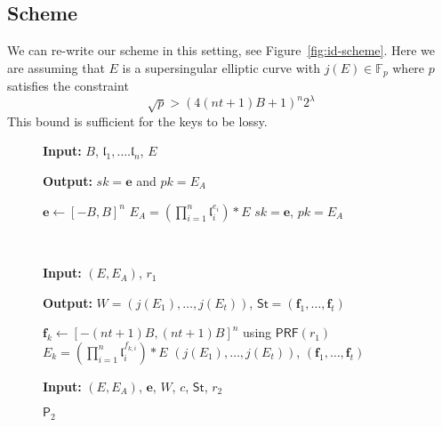 \documentclass{llncs}
\newcommand{\F}{\mathbb{F}}
\renewcommand{\l}{\mathfrak{l}}
\newcommand{\e}{\textbf{e}}
\newcommand{\f}{\textbf{f}}
\newcommand{\IGen}{\textsf{IGen}}
\newcommand{\PP}{\textsf{P}}
\newcommand{\St}{\textsf{St}}
\newcommand{\PRF}{\textsf{PRF}}
\begin{document}
\subsection{Scheme}

We can re-write our scheme in this setting, see Figure~\ref{fig:id-scheme}.
Here we are assuming that $E$ is a supersingular elliptic curve with $j(E) \in \F_p$ where $p$ satisfies the constraint
\begin{equation} \label{eq:lossy-p-bound}
  \sqrt{p} > (4(nt+1)B + 1)^{n} 2^\lambda
\end{equation}
This bound is sufficient for the keys to be lossy.


\begin{figure}
\begin{minipage}{.45\textwidth}
\begin{algorithm}[H]
	\caption{$\IGen$}
	\textbf{Input:} $B$, $\l_1, \dots. \l_n$, $E$

	\textbf{Output:} $sk =\e$ and $pk = E_A$

	\begin{algorithmic}[1]
		\State $\e \leftarrow [-B,B]^n$ 
		\State $E_A = ( \prod_{i=1}^n \l_i^{e_i} ) * E$
		\State \Return $sk= \e$, $pk = E_A$
	\end{algorithmic}
\end{algorithm}
\end{minipage}
 \ \ \ \ \ \ \ \ \ \ \ \ 
\begin{minipage}{0.45\textwidth}
\begin{algorithm}[H]
	\caption{$\PP_1$}
	\textbf{Input:} $(E,E_A)$,  $r_1$

	\textbf{Output:} $W = ( j(E_1) , \dots, j(E_t) )$, $\St = (\f_1, \dots, \f_t )$

	\begin{algorithmic}[1]
		\State $\f_k \leftarrow [-(nt+1)B,(nt+1)B]^n$ using $\PRF( r_1 )$
		\State $E_k = ( \prod_{i=1}^n \l_i^{f_{k,i}} ) * E$
		\EndFor
		\State \Return $( j(E_1) , \dots, j(E_t) )$, $(\f_1, \dots, \f_t )$
	\end{algorithmic}
\end{algorithm}
\end{minipage}



\begin{minipage}{0.45\textwidth}
\begin{algorithm}[H]
	\caption{$\PP_2$}
	\textbf{Input:} $(E,E_A)$, $\e$, $W$, $c$, $\St$, $r_2$


\end{algorithm}
\end{minipage}
\end{figure}
\end{document}
